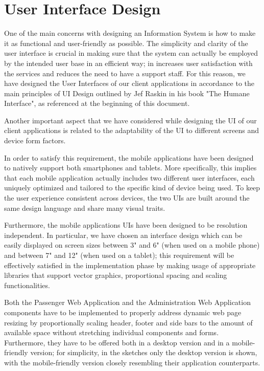 \chapter{User Interface Design}
One of the main concerns with designing an Information System is how to make it as functional and user-friendly as possible. The simplicity and clarity of the user interface is crucial in making sure that the system can actually be employed by the intended user base in an efficient way; in increases user satisfaction with the services and reduces the need to have a support staff. 
For this reason, we have designed the User Interfaces of our client applications in accordance to the main principles of UI Design outlined by Jef Raskin in his book "The Humane Interface", as referenced at the beginning of this document. 

Another important aspect that we have considered while designing the UI of our client applications is related to the adaptability of the UI to different screens and device form factors. 

In order to satisfy this requirement, the mobile applications have been designed to natively support both smartphones and tablets. More specifically, this implies that each mobile application actually includes two different user interfaces, each uniquely optimized and tailored to the specific kind of device being used. To keep the user experience consistent across devices, the two UIs are built around the same design language and share many visual traits. 

Furthermore, the mobile applications UIs have been designed to be resolution independent. In particular, we have chosen an interface design which can be easily displayed on screen sizes between 3" and 6" (when used on a mobile phone) and between 7" and 12" (when used on a tablet); this requirement will be effectively satisfied in the implementation phase by making usage of appropriate libraries that support vector graphics, proportional spacing and scaling functionalities.

Both the Passenger Web Application and the Administration Web Application components have to be implemented to properly address dynamic web page resizing by proportionally scaling header, footer and side bars to the amount of available space without stretching individual components and forms. Furthermore, they have to be offered both in a desktop version and in a mobile-friendly version; for simplicity, in the sketches only the desktop version is shown, with the mobile-friendly version closely resembling their application counterparts. 

